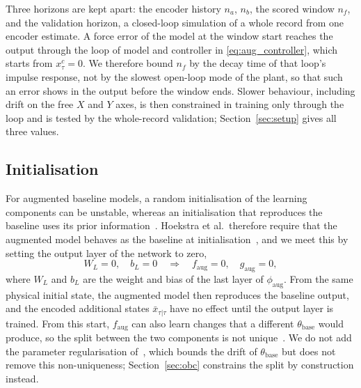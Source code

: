 Three horizons are kept apart: the encoder history $n_a$, $n_b$, the scored
window $n_f$, and the validation horizon, a closed-loop simulation of a
whole record from one encoder estimate.
A force error of the model at the window start reaches the output through
the loop of model and controller in \eqref{eq:aug_controller}, which starts
from $x^c_\tau=0$.
We therefore bound $n_f$ by the decay time of that loop's impulse response,
not by the slowest open-loop mode of the plant, so that such an error shows
in the output before the window ends.
Slower behaviour, including drift on the free $X$ and $Y$ axes, is then
constrained in training only through the loop and is tested by the
whole-record validation; Section~\ref{sec:setup} gives all three values.

\subsection{Initialisation}\label{sec:aug_init}
For augmented baseline models, a random initialisation of the learning
components can be unstable, whereas an initialisation that reproduces the
baseline uses its prior information~\cite[Sec.~5.4]{hoekstra2026lfr}.
Hoekstra et al.\ therefore require that the augmented model behaves as the
baseline at initialisation~\cite[Eq.~(29)]{hoekstra2026lfr}, and we meet
this by setting the output layer of the network to zero,
\begin{equation}
 W_L=0,\quad b_L=0
 \quad\Longrightarrow\quad
 f_{\mathrm{aug}}=0,\quad g_{\mathrm{aug}}=0 ,
 \label{eq:aug_zero_init}
\end{equation}
where $W_L$ and $b_L$ are the weight and bias of the last layer of
$\phi_{\mathrm{aug}}$.
From the same physical initial state, the augmented model then reproduces
the baseline output, and the encoded additional states $\bar x_{\tau|\tau}$
have no effect until the output layer is trained.
From this start, $f_{\mathrm{aug}}$ can also learn changes that a different
$\theta_{\mathrm{base}}$ would produce, so the split between the two
components is not unique~\cite[Sec.~5.2]{hoekstra2026lfr}.
We do not add the parameter regularisation
of~\cite[Eq.~(26)]{hoekstra2026lfr}, which bounds the drift of
$\theta_{\mathrm{base}}$ but does not remove this non-uniqueness;
Section~\ref{sec:obc} constrains the split by construction instead.

